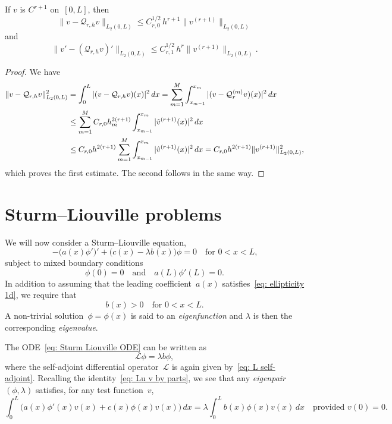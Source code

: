 \begin{theorem}
If $v$ is $C^{r+1}$ on~$[0,L]$, then
\[
\|v-\mathcal{Q}_{r,h}v\|_{L_2(0,L)}
    \le C_{r,0}^{1/2}\,h^{r+1}\|v^{(r+1)}\|_{L_2(0,L)}
\]
and
\[
\|v'-(\mathcal{Q}_{r,h}v)'\|_{L_2(0,L)}
    \le C_{r,1}^{1/2}\,h^r\|v^{(r+1)}\|_{L_2(0,L)}.
\]
\end{theorem}
\begin{proof}
We have
\begin{align*}
\|v-\mathcal{Q}_{r,h}v\|_{L_2(0,L)}^2
    &=\int_0^L|(v-\mathcal{Q}_{r,h}v)(x)|^2\,dx=\sum_{m=1}^M
    \int_{x_{m-1}}^{x_m}|(v-\mathcal{Q}_r^{\langle m\rangle}v)(x)|^2\,dx\\
    &\le\sum_{m=1}^M C_{r,0}h_m^{2(r+1)}\int_{x_{m-1}}^{x_m}
        |\hat v^{(r+1)}(x)|^2\,dx\\
    &\le C_{r,0}h^{2(r+1)}\sum_{m=1}^M\int_{x_{m-1}}^{x_m} 
        |\hat v^{(r+1)}(x)|^2\,dx
    =C_{r,0}h^{2(r+1)}\|v^{(r+1)}\|_{L_2(0,L)}^2,
\end{align*}
which proves the first estimate.  The second follows in the same way.
\end{proof}

\section{Sturm--Liouville problems}

We will now consider a Sturm--Liouville equation,
\begin{equation}\label{eq: Sturm Liouville ODE}
-\bigl(a(x)\phi'\bigr)'+\bigl(c(x)-\lambda b(x)\bigr)\phi=0\quad
	\text{for $0<x<L$,}
\end{equation}
subject to mixed boundary conditions
\begin{equation}\label{eq: Sturm Liouville bc}
\phi(0)=0\quad\text{and}\quad a(L)\phi'(L)=0.
\end{equation}
In addition to assuming that the leading coefficient~$a(x)$ 
satisfies~\eqref{eq: ellipticity 1d}, we require that
\begin{equation}\label{eq: b>0}
b(x)>0\quad\text{for $0<x<L$.}
\end{equation}
A non-trivial solution~$\phi=\phi(x)$ is said to an \emph{eigenfunction} and 
$\lambda$ is then the corresponding \emph{eigenvalue}.  

The ODE~\eqref{eq: Sturm Liouville ODE} can be written as
\[
\mathcal{L}\phi=\lambda b\phi,
\]
where the self-adjoint differential operator~$\mathcal{L}$ is again given 
by~\eqref{eq: L self-adjoint}.  Recalling the 
identity~\eqref{eq: Lu v by parts}, we see that any \emph{eigenpair} 
$(\phi,\lambda)$ satisfies, for any test function~$v$,
\[
\int_0^L\bigl(a(x)\phi'(x)v(x)+c(x)\phi(x)v(x)\bigr)\,dx
	=\lambda\int_0^Lb(x)\phi(x)v(x)\,dx
\quad\text{provided $v(0)=0$.}
\]

